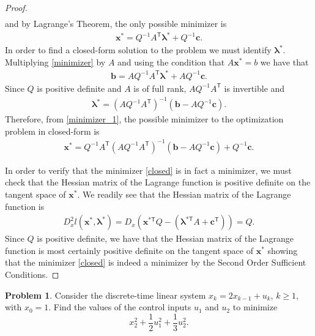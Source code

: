 \documentclass[12pt]{article}
\theoremstyle{definition}
\newtheorem{problem}{Problem}
\newcommand{\vc}[1]{\boldsymbol{#1}}
\newcommand{\tran}{\mathsf{T}}
\begin{document}
\begin{proof}
\begin{align*}
  \end{align*}
  and by Lagrange's Theorem, the only possible minimizer is
  \begin{align}\label{minimizer_1}
    \vc{x}^{*} = Q^{-1}A^\tran \vc{\lambda}^{*} + Q^{-1}\vc{c}.
  \end{align}
  In order to find a closed-form solution to the problem we must identify $\vc{\lambda}^{*}$. Multiplying
  \eqref{minimizer} by $A$ and using the condition that $A\vc{x}^{*} = b$ we have that
  \begin{align*}
    \vc{b} = AQ^{-1}A^\tran \vc{\lambda}^{*} + AQ^{-1}\vc{c}.
  \end{align*}
  Since $Q$ is positive definite and $A$ is of full rank, $AQ^{-1}A^\tran$ is invertible and
  \begin{align*}
    \vc{\lambda}^{*} = (AQ^{-1}A^\tran)^{-1}(\vc{b} - AQ^{-1}\vc{c}).
  \end{align*}
  Therefore, from \eqref{minimizer_1}, the possible minimizer to the optimization problem in closed-form is
  \begin{align}\label{closed}
    \vc{x}^{*} = Q^{-1}A^\tran(AQ^{-1}A^\tran)^{-1}(\vc{b} - AQ^{-1}\vc{c}) + Q^{-1}\vc{c}.
  \end{align}

  In order to verify that the minimizer \eqref{closed} is in fact a minimizer,
  we must check that the Hessian matrix of the Lagrange function is positive definite on the tangent space of $\vc{x}^{*}$.
  We readily see that the Hessian matrix of the Lagrange function is
  \begin{align*}
    D^2_x l(\vc{x}^{*}, \vc{\lambda}^{*}) = D_x(\vc{x}^{*\tran} Q - \left(\vc{\lambda}^{*\tran} A + \vc{c}^\tran\right)) = Q.
  \end{align*}
  Since $Q$ is positive definite, we have that the Hessian matrix of the Lagrange function is most certainly
  positive definite on the tangent space of $\vc{x}^{*}$ showing that the minimizer \eqref{closed} is indeed a minimizer by the Second Order Sufficient Conditions.
\end{proof}
\newpage


\begin{problem}
  Consider the discrete-time linear system $x_k = 2 x_{k-1} + u_k$, $k \geq 1$, with
  $x_0 = 1$. Find the values of the control inputs $u_1$ and $u_2$ to minimize
  $$x_2^2 + \frac{1}{2}u_1^2+ \frac{1}{3}u_2^2.$$
\end{problem}
\end{document}

